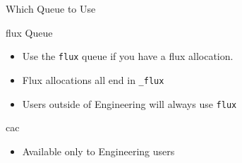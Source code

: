 \documentclass[handout]{beamer}
\begin{document}
  \begin{frame}{Which Queue to Use}
   \begin{block}{flux Queue}
    \begin{itemize}
     \item Use the \texttt{flux} queue if you have a flux allocation. 
     \item Flux allocations all end in \texttt{\_flux}
     \item Users outside of Engineering will always use \texttt{flux}
    \end{itemize}
   \end{block}
   \begin{block}{cac}
    \begin{itemize}
     \item Available only to Engineering users
    \end{itemize}
   \end{block}
  \end{frame}
\end{document}
